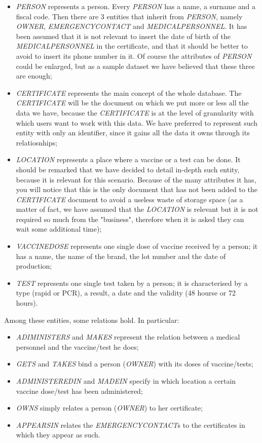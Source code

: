 \documentclass{article}
\begin{document}
\begin{itemize}
    \item \textit{PERSON} represents a person. Every \textit{PERSON} has a name, a surname and a fiscal code. Then there are 3 entities that inherit from \textit{PERSON}, namely \textit{OWNER}, \textit{EMERGENCYCONTACT} and \textit{MEDICALPERSONNEL}. It has been assumed that it is not relevant to insert the date of birth of the \textit{MEDICALPERSONNEL} in the certificate, and that it should be better to avoid to insert its phone number in it. Of course the attributes of \textit{PERSON} could be enlarged, but as a sample dataset we have believed that these three are enough;
    \item \textit{CERTIFICATE} represents the main concept of the whole database. The \textit{CERTIFICATE} will be the document on which we put more or less all the data we have, because the \textit{CERTIFICATE} is at the level of granularity  with which users want to work with this data. We have preferred to represent such entity with only an identifier, since it gains all the data it owns through its relatiosnhips;
    \item \textit{LOCATION} represents a place where a vaccine or a test can be done. It should be remarked that we have decided to detail in-depth such entity, because it is relevant for this scenario. Because of the many attributes it has, you will notice that this is the only document that has not been added to the \textit{CERTIFICATE} document to avoid a useless waste of storage space (as a matter of fact, we have assumed that the \textit{LOCATION} is relevant but it is not required so much from the "business", therefore when it is asked they can wait some additional time);
    \item \textit{VACCINEDOSE} represents one single dose of vaccine received by a person; it has a name, the name of the brand, the lot number and the date of production;
    \item \textit{TEST} represents one single test taken by a person; it is characterised by a type (rapid or PCR), a result, a date and the validity (48 hourse or 72 hours).
\end{itemize}
Among these entities, some relations hold. In particular:
\begin{itemize}
    \item \textit{ADIMINISTERS} and \textit{MAKES} represent the relation between a medical personnel and the vaccine/test he does;
    \item \textit{GETS} and \textit{TAKES} bind a person (\textit{OWNER}) with its doses of vaccine/tests;
    \item \textit{ADMINISTEREDIN} and \textit{MADEIN} specify in which location a certain vaccine dose/test has been administered;
    \item \textit{OWNS} simply relates a person (\textit{OWNER}) to her certificate;
    \item \textit{APPEARSIN} relates the \textit{EMERGENCYCONTACT}s to the certificates in which they appear as such.
\end{itemize}
\newpage
\end{document}
